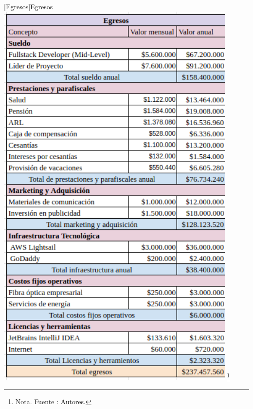 \vspace{2mm}
    \begin{minipage}{0.9\textwidth}
    \centering
    [{Egresos}]{Egresos}
    \label{Ingresos}
    \includegraphics[width=0.9\textwidth]{Content/Images/AF/egresos.png}
    \footnote{Nota. \textup{Fuente : Autores.}}
    \end{minipage}